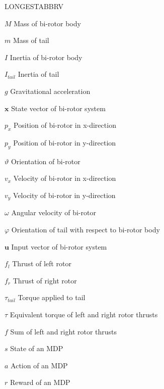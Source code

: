 \begin{theglossaryvar}{LONGESTABBRV}

\item[$M$]  Mass of bi-rotor body
\item[$m$]  Mass of tail
\item[$I$]  Inertia of bi-rotor body
\item[$I_{tail}$]  Inertia of tail
\item[$g$]  Gravitational acceleration
\item[$\mathbf{x}$]  State vector of bi-rotor system
\item[$p_x$]  Position of bi-rotor in x-direction
\item[$p_y$]  Position of bi-rotor in y-direction
\item[$\vartheta$]  Orientation of bi-rotor
\item[$v_x$]  Velocity of bi-rotor in x-direction
\item[$v_y$]  Velocity of bi-rotor in y-direction
\item[$\omega$]  Angular velocity of bi-rotor
\item[$\varphi$]  Orientation of tail with respect to bi-rotor body
\item[$\mathbf{u}$]  Input vector of bi-rotor system
\item[$f_l$]    Thrust of left rotor
\item[$f_r$]    Thrust of right rotor
\item[$\tau_{tail}$]   Torque applied to tail
\item[$\tau$]   Equivalent torque of left and right rotor thrusts
\item[$f$]   Sum of left and right rotor thrusts
\item[$s$]   State of an MDP
\item[$a$]   Action of an MDP
\item[$r$]   Reward of an MDP


\end{theglossaryvar}

